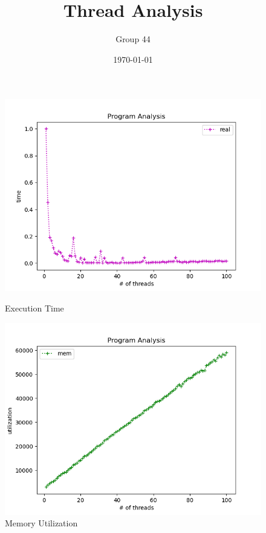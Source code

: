 \documentclass[11pt, titlepage]{article}
\begin{document}
  \begin{titlepage}
    \title{\Huge{Thread Analysis}}
    \author{\Large{Group 44}}
    \date{\today}
    \maketitle
  \end{titlepage}

  \begin{figure}[h]
    \centering
    \includegraphics[height=0.3\textheight]{time.png}
      \caption{Execution Time}
    \includegraphics[height=0.3\textheight]{mem_util.png}
      \caption{Memory Utilization}

\end{figure}
\end{document}
